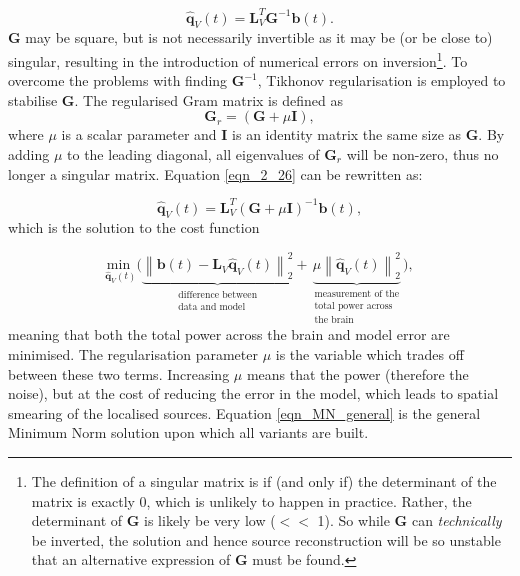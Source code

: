 \begin{equation}
		\hat{\mathbf{q}}_V(t) = \mathbf{L}^T_V\mathbf{G}^{-1} \mathbf{b}(t).	
	\label{eqn_2_26}	
\end{equation} $\mathbf{G}$ may be square, but is not necessarily invertible as it may be (or be close to) singular, resulting in the introduction of numerical errors on inversion\footnote{The definition of a singular matrix is if (and only if) the determinant of the matrix is exactly 0, which is unlikely to happen in practice. Rather, the determinant of \textbf{G} is likely be very low ($<<$ 1). So while \textbf{G} can \textit{technically} be inverted, the solution and hence source reconstruction will be so unstable that an alternative expression of \textbf{G} must be found.}. To overcome the problems with finding $\mathbf{G}^{-1}$, Tikhonov regularisation \citep{Tikhonov1943} is employed to stabilise $\mathbf{G}$. The regularised Gram matrix is defined as 
\begin{equation}
\mathbf{G}_r = (\mathbf{G}+\mu\mathbf{I}),
\end{equation} where $\mu$ is a scalar parameter and $\mathbf{I}$ is an identity matrix the same size as $\mathbf{G}$. By adding $\mu$ to the leading diagonal, all eigenvalues of $\mathbf{G}_r$ will be non-zero, thus no longer a singular matrix. Equation \ref{eqn_2_26} can be rewritten as:

\begin{equation} \label{eqn_MN_general}
\hat{\mathbf{q}}_V(t) = \mathbf{L}_V^{T}(\mathbf{G}+\mu\mathbf{I})^{-1} \mathbf{b}(t),
\end{equation} which is the solution to the cost function \citep{Sekihara2008}

\begin{equation}
\underset{\hat{\mathbf{q}}_V(t)}{\text{min }} \big(\underbrace{\left\| \textbf{b}(t)-\mathbf{L}_V\hat{\mathbf{q}}_V(t) \right\|^2_2}_{\substack{\text{difference between} \\\text{data and model}}} + \underbrace{\mu\left\| \hat{\mathbf{q}}_V(t) \right\|^2_2}_{\substack{\text{measurement of the} \\\text{total power across} \\\text{the brain}}} \big),
\end{equation} meaning that both the total power across the brain and model error are minimised. The regularisation parameter $\mu$ is the variable which trades off between these two terms. Increasing $\mu$ means that the power (therefore the noise), but at the cost of reducing the error in the model, which leads to spatial smearing of the localised sources. Equation \ref{eqn_MN_general} is the general Minimum Norm solution upon which all variants are built.

